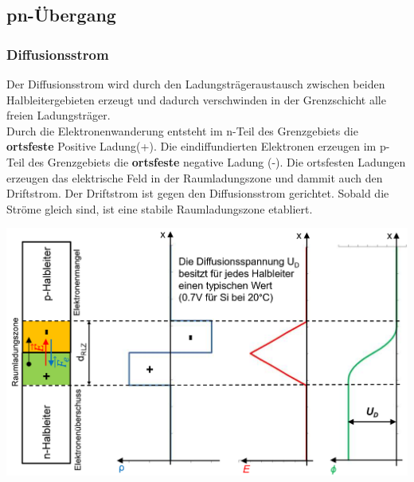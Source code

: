 \subsection{pn-Übergang}
\begin{multicols}{2}
    \begin{minipage}{\linewidth}
        \subsubsection{Diffusionsstrom}
            Der Diffusionsstrom wird durch den Ladungsträgeraustausch zwischen beiden Halbleitergebieten erzeugt und dadurch verschwinden in der Grenzschicht alle freien Ladungsträger.\\
            Durch die Elektronenwanderung entsteht im n-Teil des Grenzgebiets die \textbf{ortsfeste} Positive Ladung(+). Die eindiffundierten Elektronen erzeugen im p-Teil des Grenzgebiets die \textbf{ortsfeste} negative Ladung (-). Die ortsfesten Ladungen erzeugen das elektrische Feld in der Raumladungszone und dammit auch den Driftstrom.\newline
            Der Driftstrom ist gegen den Diffusionsstrom gerichtet. Sobald die Ströme gleich sind, ist eine stabile Raumladungszone etabliert.   
    \end{minipage}
    
    \includegraphics[width=0.9\linewidth]{images/pnuebergang}
\end{multicols}


